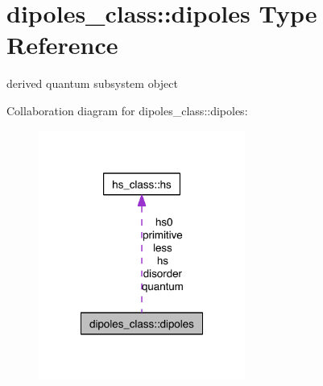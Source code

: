 \hypertarget{structdipoles__class_1_1dipoles}{}\section{dipoles\+\_\+class\+:\+:dipoles Type Reference}
\label{structdipoles__class_1_1dipoles}


derived quantum subsystem object  




Collaboration diagram for dipoles\+\_\+class\+:\+:dipoles\+:\nopagebreak
\begin{figure}[H]
\begin{center}
\leavevmode
\includegraphics[width=192pt]{structdipoles__class_1_1dipoles__coll__graph}
\end{center}
\end{figure}
